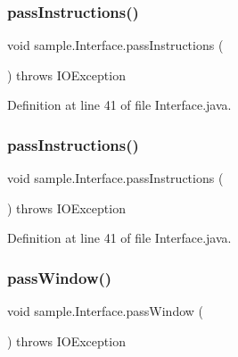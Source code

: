 \subsubsection{\texorpdfstring{pass\+Instructions()}{passInstructions()}\hspace{0.1cm}{\footnotesize\ttfamily [1/2]}}
{\footnotesize\ttfamily void sample.\+Interface.\+pass\+Instructions (\begin{DoxyParamCaption}{ }\end{DoxyParamCaption}) throws I\+O\+Exception\hspace{0.3cm}{\ttfamily [inline]}}



Definition at line 41 of file Interface.\+java.

\mbox{\label{classsample_1_1_interface_a98d6d48177ac553f1739b565cac0402c}} 
\subsubsection{\texorpdfstring{pass\+Instructions()}{passInstructions()}\hspace{0.1cm}{\footnotesize\ttfamily [2/2]}}
{\footnotesize\ttfamily void sample.\+Interface.\+pass\+Instructions (\begin{DoxyParamCaption}{ }\end{DoxyParamCaption}) throws I\+O\+Exception\hspace{0.3cm}{\ttfamily [inline]}}



Definition at line 41 of file Interface.\+java.

\mbox{\label{classsample_1_1_interface_a845d7280ea87f3cd86c8f30b997312dc}} 
\subsubsection{\texorpdfstring{pass\+Window()}{passWindow()}\hspace{0.1cm}{\footnotesize\ttfamily [1/2]}}
{\footnotesize\ttfamily void sample.\+Interface.\+pass\+Window (\begin{DoxyParamCaption}{ }\end{DoxyParamCaption}) throws I\+O\+Exception\hspace{0.3cm}{\ttfamily [inline]}}



